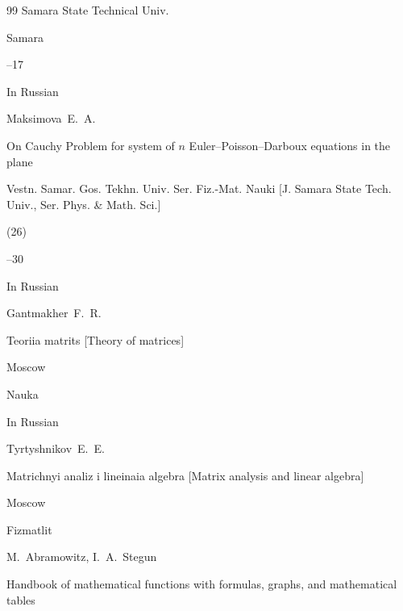 \begin{thebibliography}{99}
\publ Samara State Technical Univ.

\publaddr Samara

--17








\lang In Russian

\by Maksimova~E.~A.

\paper On Cauchy Problem for system of $n$ Euler--Poisson--Darboux equations in the plane

\jour Vestn. Samar. Gos. Tekhn. Univ. Ser. Fiz.-Mat. Nauki \rm [J. Samara State Tech. Univ., Ser. Phys. \& Math. Sci.]


(26)

--30





\lang In Russian

\by Gantmakher~F.~R. 

\book Teoriia matrits \rm [Theory of matrices]

\publaddr Moscow

\publ Nauka










\lang In Russian

\by Tyrtyshnikov~E.~E.

\book Matrichnyi analiz i lineinaia algebra \rm [Matrix analysis and linear algebra]

\publaddr Moscow

\publ Fizmatlit













\eds M.~Abramowitz, I.~A.~Stegun

\book Handbook of mathematical functions with formulas, graphs, and mathematical tables


\end{thebibliography}
